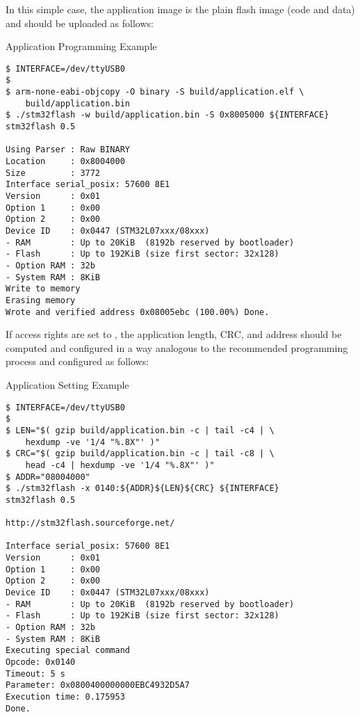 In this simple case, the application image is the plain flash image (code and data) and should be uploaded as follows:

\begin{docCodeExampleTitled}{Application Programming Example}
\begin{verbatim}
$ INTERFACE=/dev/ttyUSB0
$
$ arm-none-eabi-objcopy -O binary -S build/application.elf \
    build/application.bin
$ ./stm32flash -w build/application.bin -S 0x8005000 ${INTERFACE}
stm32flash 0.5

Using Parser : Raw BINARY
Location     : 0x8004000
Size         : 3772
Interface serial_posix: 57600 8E1
Version      : 0x01
Option 1     : 0x00
Option 2     : 0x00
Device ID    : 0x0447 (STM32L07xxx/08xxx)
- RAM        : Up to 20KiB  (8192b reserved by bootloader)
- Flash      : Up to 192KiB (size first sector: 32x128)
- Option RAM : 32b
- System RAM : 8KiB
Write to memory
Erasing memory
Wrote and verified address 0x08005ebc (100.00%) Done.

\end{verbatim}
\end{docCodeExampleTitled}

If access rights are set to ,
the application length, CRC, and address should be computed and configured in a way analogous to the recommended programming process
and configured as follows:

\begin{docCodeExampleTitled}{Application Setting Example}
\begin{verbatim}
$ INTERFACE=/dev/ttyUSB0
$
$ LEN="$( gzip build/application.bin -c | tail -c4 | \
    hexdump -ve '1/4 "%.8X"' )"
$ CRC="$( gzip build/application.bin -c | tail -c8 | \
    head -c4 | hexdump -ve '1/4 "%.8X"' )"
$ ADDR="08004000"
$ ./stm32flash -x 0140:${ADDR}${LEN}${CRC} ${INTERFACE}
stm32flash 0.5

http://stm32flash.sourceforge.net/

Interface serial_posix: 57600 8E1
Version      : 0x01
Option 1     : 0x00
Option 2     : 0x00
Device ID    : 0x0447 (STM32L07xxx/08xxx)
- RAM        : Up to 20KiB  (8192b reserved by bootloader)
- Flash      : Up to 192KiB (size first sector: 32x128)
- Option RAM : 32b
- System RAM : 8KiB
Executing special command
Opcode: 0x0140
Timeout: 5 s
Parameter: 0x0800400000000EBC4932D5A7
Execution time: 0.175953
Done.

\end{verbatim}
\end{docCodeExampleTitled}

